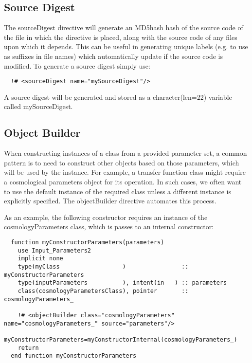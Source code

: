 \subsection{Source Digest}

The {\normalfont \ttfamily sourceDigest} directive will generate an \gls{MD5hash} hash of the source code of the file in which the directive is placed, along with the source code of any files upon which it depends. This can be useful in generating unique labels (e.g. to use as suffixes in file names) which automatically update if the source code is modified. To generate a source digest simply use:

\begin{lstlisting}
  !# <sourceDigest name="mySourceDigest"/>
\end{lstlisting}

A source digest will be generated and stored as a {\normalfont \ttfamily character(len=22)} variable called {\normalfont \ttfamily mySourceDigest}.

\subsection{Object Builder}

When constructing instances of a class from a provided parameter set, a common pattern is to need to construct other objects based on those parameters, which will be used by the instance. For example, a transfer function class might require a cosmological parameters object for its operation. In such cases, we often want to use the default instance of the required class unless a different instance is explicitly specified. The {\normalfont \ttfamily objectBuilder} directive automates this process.

As an example, the following constructor requires an instance of the {\normalfont \ttfamily cosmologyParameters} class, which is passes to an internal constructor:

\begin{lstlisting}  
  function myConstructorParameters(parameters)
    use Input_Parameters2
    implicit none
    type(myClass                  )                :: myConstructorParameters
    type(inputParameters          ), intent(in   ) :: parameters
    class(cosmologyParametersClass), pointer       :: cosmologyParameters_    

    !# <objectBuilder class="cosmologyParameters" name="cosmologyParameters_" source="parameters"/>
    myConstructorParameters=myConstructorInternal(cosmologyParameters_)
    return
  end function myConstructorParameters
\end{lstlisting}

